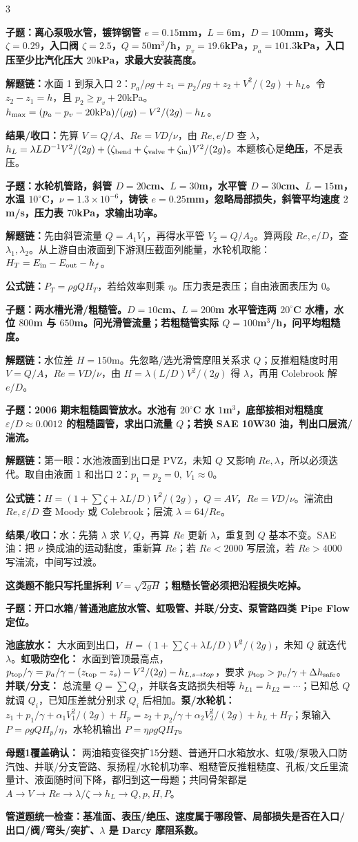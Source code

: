 \documentclass[a4paper]{article}
\newcommand{\qt}[1]{\vspace{0.25pt}\colorbox{Q}{\parbox{\dimexpr\linewidth-2\fboxsep}{\color{white}\bfseries #1}}\par}
\newcommand{\ans}[1]{\colorbox{G}{\parbox{\dimexpr\linewidth-2\fboxsep}{#1}}\par}
\newcommand{\warn}[1]{\colorbox{Y}{\parbox{\dimexpr\linewidth-2\fboxsep}{\color{E}\bfseries #1}}\par}
\newcommand{\chain}[1]{{\color{A}\bfseries 解题链：}#1\par}
\newcommand{\res}[1]{{\color{E}\bfseries 结果/收口：}#1\par}
\newcommand{\form}[1]{{\color{M}\bfseries 公式链：}#1\par}
\begin{document}
\begin{multicols}{3}
\qt{子题：离心泵吸水管，镀锌钢管 $e=0.15$mm，$L=6$m，$D=100$mm，弯头 $\zeta=0.29$，入口阀 $\zeta=2.5$，$Q=50$m$^3$/h，$p_v=19.6$kPa，$p_a=101.3$kPa，入口压至少比汽化压大 $20$kPa，求最大安装高度。}
\chain{水面 1 到泵入口 2：$p_a/\rho g+z_1=p_2/\rho g+z_2+V^2/(2g)+h_L$。令 $z_2-z_1=h$，且 $p_2\ge p_v+20$kPa。$h_{\max}=(p_a-p_v-20{\rm kPa})/(\rho g)-V^2/(2g)-h_L$。}
\res{先算 $V=Q/A$、$Re=VD/\nu$，由 $Re,e/D$ 查 $\lambda$，$h_L=\lambda LD^{-1}V^2/(2g)+(\zeta_{\rm bend}+\zeta_{\rm valve}+\zeta_{\rm in}) V^2/(2g)$。本题核心是\textbf{绝压}，不是表压。}

\qt{子题：水轮机管路，斜管 $D=20$cm、$L=30$m，水平管 $D=30$cm、$L=15$m，水温 $10^\circ$C，$\nu=1.3\times10^{-6}$，铸铁 $e=0.25$mm，忽略局部损失，斜管平均速度 $2$m/s，压力表 $70$kPa，求输出功率。}
\chain{先由斜管流量 $Q=A_1V_1$，再得水平管 $V_2=Q/A_2$。算两段 $Re,e/D$，查 $\lambda_1,\lambda_2$。从上游自由液面到下游测压截面列能量，水轮机取能：$H_T=E_{\rm in}-E_{\rm out}-h_f$。}
\form{$P_T=\rho gQH_T$，若给效率则乘 $\eta$。压力表是表压；自由液面表压为 0。}

\qt{子题：两水槽光滑/粗糙管。$D=10$cm、$L=200$m 水平管连两 $20^\circ$C 水槽，水位 $800$m 与 $650$m。问光滑管流量；若粗糙管实际 $Q=100$m$^3$/h，问平均粗糙度。}
\chain{水位差 $H=150$m。先忽略/选光滑管摩阻关系求 $Q$；反推粗糙度时用 $V=Q/A$，$Re=VD/\nu$，由 $H=\lambda(L/D)V^2/(2g)$ 得 $\lambda$，再用 Colebrook 解 $e/D$。}

\qt{子题：2006 期末粗糙圆管放水。水池有 $20^\circ$C 水 $1$m$^3$，底部接相对粗糙度 $\varepsilon/D\approx0.0012$ 的粗糙圆管，求出口流量 $Q$；若换 SAE 10W30 油，判出口层流/湍流。}
\chain{第一眼：水池液面到出口是 PVZ，未知 $Q$ 又影响 $Re,\lambda$，所以必须迭代。取自由液面 1 和出口 2：$p_1=p_2=0,\ V_1\approx0$。}
\form{$H=\left(1+\sum\zeta+\lambda L/D\right)V^2/(2g)$，$Q=AV$，$Re=VD/\nu$。湍流由 $Re,\varepsilon/D$ 查 Moody 或 Colebrook；层流 $\lambda=64/Re$。}
\res{水：先猜 $\lambda$ 求 $V,Q$，再算 $Re$ 更新 $\lambda$，重复到 $Q$ 基本不变。SAE 油：把 $\nu$ 换成油的运动黏度，重新算 $Re$；若 $Re<2000$ 写层流，若 $Re>4000$ 写湍流，中间写过渡。}
\warn{这类题不能只写托里拆利 $V=\sqrt{2gH}$；粗糙长管必须把沿程损失吃掉。}

\qt{子题：开口水箱/普通池底放水管、虹吸管、并联/分支、泵管路四类 Pipe Flow 定位。}
\ans{\textbf{池底放水：} 大水面到出口，$H=(1+\sum\zeta+\lambda L/D)V^2/(2g)$，未知 $Q$ 就迭代 $\lambda$。\textbf{虹吸防空化：} 水面到管顶最高点，$p_{\rm top}/\gamma=p_a/\gamma-(z_{\rm top}-z_s)-V^2/(2g)-h_{L,s\to top}$，要求 $p_{\rm top}>p_v/\gamma+\Delta h_{\rm safe}$。\textbf{并联/分支：} 总流量 $Q=\sum Q_i$，并联各支路损失相等 $h_{L1}=h_{L2}=\cdots$；已知总 $Q$ 就调 $Q_i$，已知压差就分别求 $Q_i$ 后相加。\textbf{泵/水轮机：} $z_1+p_1/\gamma+\alpha_1V_1^2/(2g)+H_p=z_2+p_2/\gamma+\alpha_2V_2^2/(2g)+h_L+H_T$；泵输入 $P=\rho gQH_p/\eta$，水轮机输出 $P=\eta\rho gQH_T$。}
\ans{\textbf{母题1覆盖确认：} 两油箱变径突扩15分题、普通开口水箱放水、虹吸/泵吸入口防汽蚀、并联/分支管路、泵扬程/水轮机功率、粗糙管反推粗糙度、孔板/文丘里流量计、液面随时间下降，都归到这一母题；共同骨架都是 $A\to V\to Re\to\lambda/\zeta\to h_L\to Q,p,H,P$。}
\warn{管道题统一检查：基准面、表压/绝压、速度属于哪段管、局部损失是否在入口/出口/阀/弯头/突扩、$\lambda$ 是 Darcy 摩阻系数。}


\end{multicols}
\end{document}
